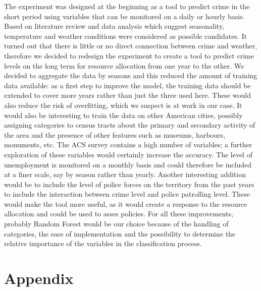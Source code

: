 \documentclass [a4paper,12 pt]{article}
\begin{document}
The experiment was designed at the beginning as a tool to predict crime in the short period using variables that can be monitored on a daily or hourly basis. Based on literature review and data analysis which suggest seasonality, temperature and weather conditions were considered as possible candidates. It turned out that there is little or no direct connection between crime and weather, therefore we decided to redesign the experiment to create a tool to predict crime levels on the long term for resource allocation from one year to the other. We decided to aggregate the data by seasons and this reduced the amount of training data available: as a first step to improve the model, the training data should be extended to cover more years rather than just the three used here. These would also reduce the risk of overfitting, which we suspect is at work in our case. It would also be interesting to train the data on other American cities, possibly assigning categories to census tracts about the primary and secondary activity of the area and the presence of other features such as museums, harbours, monuments, etc. 
The ACS survey contains a high number of variables; a further exploration of these variables would certainly increase the accuracy. The level of unemployment is monitored on a monthly basis and could therefore be included at a finer scale, say by season rather than yearly. Another interesting addition would be to include the level of police forces on the territory from the past years to include the interaction between crime level and police patrolling level. These would make the tool more useful, as it would create a response to the resource allocation and could be used to asses policies.
For all these improvements, probably Random Forest would be our choice because of the handling of categories, the ease of implementation and the possibility to determine the relative importance of the variables in the classification process.




\clearpage

\section{Appendix}\label{appendix}


\clearpage



\end{document}
